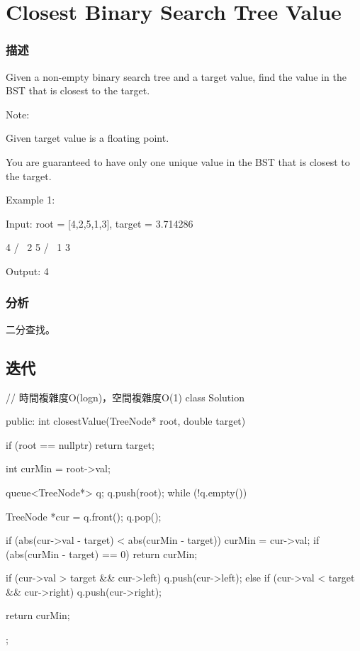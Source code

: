 \section{Closest Binary Search Tree Value} %
\label{sec:closest-binary-search-tree-value}


\subsubsection{描述}
Given a non-empty binary search tree and a target value, find the value in the BST that is closest to the target.

Note:
\begindot
\item Given target value is a floating point.
\item You are guaranteed to have only one unique value in the BST that is closest to the target.
\myenddot


Example 1:
\begin{Code}
Input: root = [4,2,5,1,3], target = 3.714286

    4
   / \
  2   5
 / \
1   3

Output: 4
\end{Code}

\subsubsection{分析}
二分查找。


\subsection{迭代}
\begin{Code}
// 時間複雜度O(logn)，空間複雜度O(1)
class Solution {
public:
    int closestValue(TreeNode* root, double target) {
        if (root == nullptr) return target;

        int curMin = root->val;

        queue<TreeNode*> q;
        q.push(root);
        while (!q.empty()) {
            TreeNode *cur = q.front();
            q.pop();

            if (abs(cur->val - target) < abs(curMin - target)) {
                curMin = cur->val;
                if (abs(curMin - target) == 0) return curMin;
            }

            if (cur->val > target && cur->left)
                q.push(cur->left);
            else if (cur->val < target && cur->right)
                q.push(cur->right);
        }

        return curMin;
    }
};
\end{Code}

